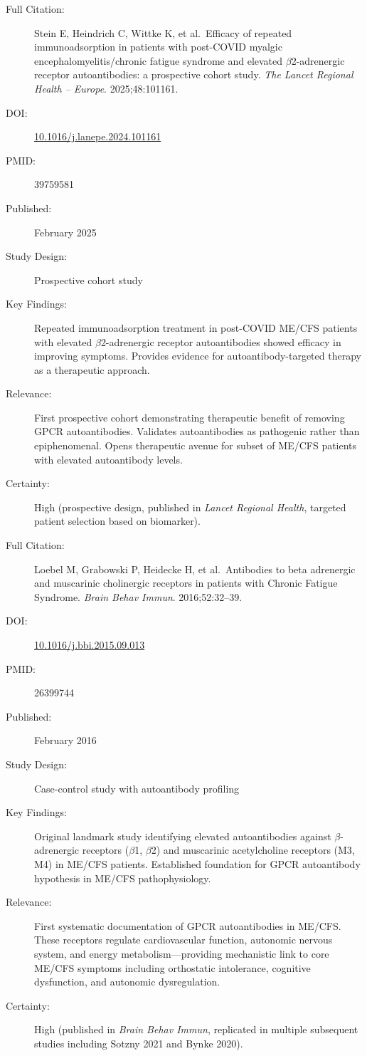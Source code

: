 \begin{description}
    \item[Full Citation:] Stein E, Heindrich C, Wittke K, et al.\ Efficacy of repeated immunoadsorption in patients with post-COVID myalgic encephalomyelitis/chronic fatigue syndrome and elevated $\beta$2-adrenergic receptor autoantibodies: a prospective cohort study. \textit{The Lancet Regional Health -- Europe}. 2025;48:101161.
    \item[DOI:] \href{https://doi.org/10.1016/j.lanepe.2024.101161}{10.1016/j.lanepe.2024.101161}
    \item[PMID:] 39759581
    \item[Published:] February 2025
    \item[Study Design:] Prospective cohort study
    \item[Key Findings:] Repeated immunoadsorption treatment in post-COVID ME/CFS patients with elevated $\beta$2-adrenergic receptor autoantibodies showed efficacy in improving symptoms. Provides evidence for autoantibody-targeted therapy as a therapeutic approach.
    \item[Relevance:] First prospective cohort demonstrating therapeutic benefit of removing GPCR autoantibodies. Validates autoantibodies as pathogenic rather than epiphenomenal. Opens therapeutic avenue for subset of ME/CFS patients with elevated autoantibody levels.
    \item[Certainty:] High (prospective design, published in \textit{Lancet Regional Health}, targeted patient selection based on biomarker).
\end{description}

\begin{description}
    \item[Full Citation:] Loebel M, Grabowski P, Heidecke H, et al.\ Antibodies to beta adrenergic and muscarinic cholinergic receptors in patients with Chronic Fatigue Syndrome. \textit{Brain Behav Immun}. 2016;52:32--39.
    \item[DOI:] \href{https://doi.org/10.1016/j.bbi.2015.09.013}{10.1016/j.bbi.2015.09.013}
    \item[PMID:] 26399744
    \item[Published:] February 2016
    \item[Study Design:] Case-control study with autoantibody profiling
    \item[Key Findings:] Original landmark study identifying elevated autoantibodies against $\beta$-adrenergic receptors ($\beta$1, $\beta$2) and muscarinic acetylcholine receptors (M3, M4) in ME/CFS patients. Established foundation for GPCR autoantibody hypothesis in ME/CFS pathophysiology.
    \item[Relevance:] First systematic documentation of GPCR autoantibodies in ME/CFS. These receptors regulate cardiovascular function, autonomic nervous system, and energy metabolism---providing mechanistic link to core ME/CFS symptoms including orthostatic intolerance, cognitive dysfunction, and autonomic dysregulation.
    \item[Certainty:] High (published in \textit{Brain Behav Immun}, replicated in multiple subsequent studies including Sotzny 2021 and Bynke 2020).
\end{description}

